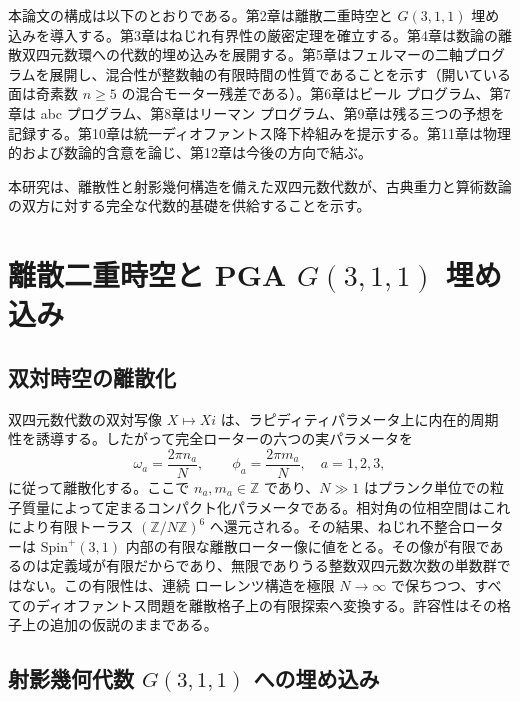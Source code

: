 \documentclass[a4paper]{article}
\theoremstyle{definition}
\theoremstyle{remark}
\begin{document}
本論文の構成は以下のとおりである。第2章は離散二重時空と \(G(3,1,1)\) 埋め込みを導入する。第3章はねじれ有界性の厳密定理を確立する。第4章は数論の離散双四元数環への代数的埋め込みを展開する。第5章はフェルマーの二軸プログラムを展開し、混合性が整数軸の有限時間の性質であることを示す（開いている面は奇素数 \(n\ge 5\) の混合モーター残差である）。第6章はビール プログラム、第7章は abc プログラム、第8章はリーマン プログラム、第9章は残る三つの予想を記録する。第10章は統一ディオファントス降下枠組みを提示する。第11章は物理的および数論的含意を論じ、第12章は今後の方向で結ぶ。

本研究は、離散性と射影幾何構造を備えた双四元数代数が、古典重力と算術数論の双方に対する完全な代数的基礎を供給することを示す。

\section{離散二重時空と PGA \texorpdfstring{\(G(3,1,1)\)}{G(3,1,1)} 埋め込み}

\subsection{双対時空の離散化}

双四元数代数の双対写像 \( X \mapsto Xi \) は、ラピディティパラメータ上に内在的周期性を誘導する。したがって完全ローターの六つの実パラメータを
\[
\omega_a = \frac{2\pi n_a}{N}, \qquad \phi_a = \frac{2\pi m_a}{N}, \quad a=1,2,3,
\]
に従って離散化する。ここで \( n_a, m_a \in \mathbb{Z} \) であり、\( N \gg 1 \) はプランク単位での粒子質量によって定まるコンパクト化パラメータである。相対角の位相空間はこれにより有限トーラス \( (\mathbb{Z}/N\mathbb{Z})^6 \) へ還元される。その結果、ねじれ不整合ローターは \(\mathrm{Spin}^+(3,1)\) 内部の有限な離散ローター像に値をとる。その像が有限であるのは定義域が有限だからであり、無限でありうる整数双四元数次数の単数群ではない。この有限性は、連続 ローレンツ構造を極限 \( N \to \infty \) で保ちつつ、すべてのディオファントス問題を離散格子上の有限探索へ変換する。許容性はその格子上の追加の仮説のままである。

\subsection{射影幾何代数 \texorpdfstring{\(G(3,1,1)\)}{G(3,1,1)} への埋め込み}
\end{document}
